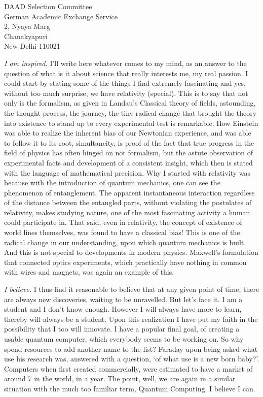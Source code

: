 \documentclass{letter}
\begin{document}
\begin{letter}{DAAD Selection Committee\\German Academic Exchange Service\\2, Nyaya Marg\\Chanakyapuri\\New Delhi-110021}
\begin{enumerate}
\emph{I am inspired.} I'll write here whatever comes to my mind, as an answer to the question of what is it about science that really interests me, my real passion. I could start by stating some of the things I find extremely fascinating and yes, without too much surprise, we have relativity (special). This is to say that not only is the formalism, as given in Landau's Classical theory of fields, astounding, the thought process, the journey, the tiny radical change that brought the theory into existence to stand up to every experimental test is remarkable. How Einstein was able to realize the inherent bias of our Newtonian experience, and was able to follow it to its root, simultaneity, is proof of the fact that true progress in the field of physics has often hinged on not formalism, but the astute observation of experimental facts and development of a consistent insight, which then is stated with the language of mathematical precision. Why I started with relativity was because with the introduction of quantum mechanics, one can see the phenomenon of entanglement. The apparent instantaneous interaction regardless of the distance between the entangled parts, without violating the postulates of relativity, makes studying nature, one of the most fascinating activity a human could participate in. That said, even in relativity, the concept of existence of world lines themselves, was found to have a classical bias! This is one of the radical change in our understanding, upon which quantum mechanics is built. And this is not special to developments in modern physics. Maxwell's formulation that connected optics experiments, which practically have nothing in common with wires and magnets, was again an example of this.

\emph{I believe.} I thus find it reasonable to believe that at any given point of time, there are always new discoveries, waiting to be unravelled. But let's face it. I am a student and I don't know enough. However I will always have more to learn, thereby will always be a student. Upon this realization I have put my faith in the possibility that I too will innovate. I have a popular final goal, of creating a usable quantum computer, which everybody seems to be working on. So why spend resources to add another name to the list? Faraday upon being asked what use his research was, answered with a question, `of what use is a new born baby?'. Computers when first created commercially, were estimated to have a market of around 7 in the world, in a year. The point, well, we are again in a similar situation with the much too familiar term, Quantum Computing. I believe I can.



\end{enumerate}
\end{letter}
\end{document}
